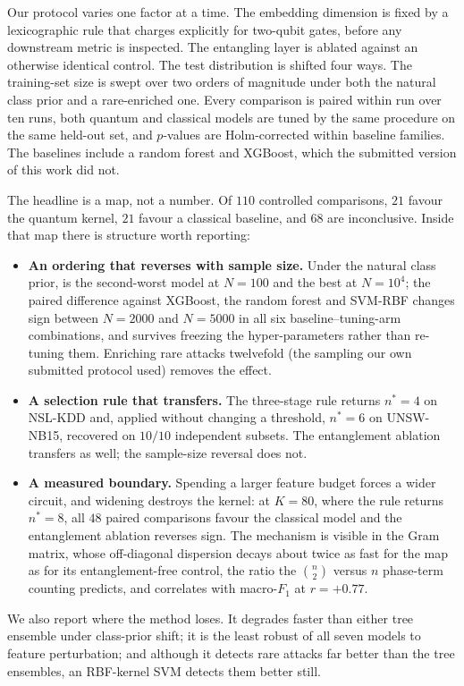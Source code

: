 \begin{revbody}
Our protocol varies one factor at a time. The embedding dimension is fixed by a
lexicographic rule that charges explicitly for two-qubit gates, before any
downstream metric is inspected. The entangling layer is ablated against an
otherwise identical control. The test distribution is shifted four ways. The
training-set size is swept over two orders of magnitude under both the natural
class prior and a rare-enriched one. Every comparison is paired within run over
ten runs, both quantum and classical models are tuned by the same procedure on
the same held-out set, and $p$-values are Holm-corrected within baseline
families. The baselines include a random forest and XGBoost, which the submitted
version of this work did not.

The headline is a map, not a number. Of $110$ controlled comparisons, $21$
favour the quantum kernel, $21$ favour a classical baseline, and $68$ are
inconclusive. Inside that map there is structure worth reporting:

\begin{itemize}
  \item \textbf{An ordering that reverses with sample size.} Under the natural
    class prior, \QSVM{} is the second-worst model at $N=100$ and the best at
    $N=10^{4}$; the paired difference against XGBoost, the random forest and
    SVM-RBF changes sign between $N=2000$ and $N=5000$ in all six
    baseline--tuning-arm combinations, and survives freezing the
    hyper-parameters rather than re-tuning them. Enriching rare attacks
    twelvefold (the sampling our own submitted protocol used) removes the
    effect.
  \item \textbf{A selection rule that transfers.} The three-stage rule returns
    $n^{\ast}=4$ on NSL-KDD and, applied without changing a threshold,
    $n^{\ast}=6$ on UNSW-NB15, recovered on $10/10$ independent subsets. The
    entanglement ablation transfers as well; the sample-size reversal does not.
  \item \textbf{A measured boundary.} Spending a larger feature budget forces a
    wider circuit, and widening destroys the kernel: at $K=80$, where the rule
    returns $n^{\ast}=8$, all $48$ paired comparisons favour the classical
    model and the entanglement ablation reverses sign. The mechanism is visible
    in the Gram matrix, whose off-diagonal dispersion decays about twice as fast
    for the \ZZ{} map as for its entanglement-free control, the ratio the
    $\binom{n}{2}$ versus $n$ phase-term counting predicts, and correlates
    with macro-$F_{1}$ at $r=+0.77$.
\end{itemize}

We also report where the method loses. It degrades faster than either tree
ensemble under class-prior shift; it is the least robust of all seven models to
feature perturbation; and although it detects rare attacks far better than the
tree ensembles, an RBF-kernel SVM detects them better still.
\end{revbody}

